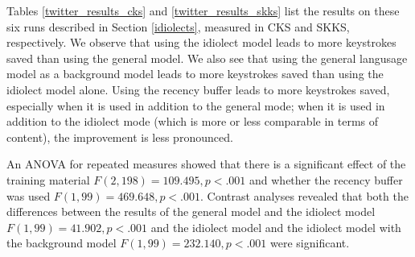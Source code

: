 \documentclass[12pt]{article}
\begin{document}
Tables \ref{twitter_results_cks} and \ref{twitter_results_skks} list the results on these six runs described in Section \ref{idiolects}, measured in CKS and SKKS, respectively. We observe that using the idiolect model leads to more keystrokes saved than using the general model. We also see that using the general langusage model as a background model leads to more keystrokes saved than using the idiolect model alone. Using the recency buffer leads to more keystrokes saved, especially when it is used in addition to the general mode; when it is used in addition to the idiolect mode (which is more or less comparable in terms of content), the improvement is less pronounced.

An ANOVA for repeated measures showed that there is a significant effect of the training material $F(2,198) = 109.495, p < .001$ and whether the recency buffer was used $F(1,99) = 469.648, p < .001$. Contrast analyses revealed that both the differences between the results of the general model and the idiolect model $F(1,99) = 41.902, p < .001$ and the idiolect model and the idiolect model with the background model $F(1,99) = 232.140, p < .001$ were significant.
\end{document}
